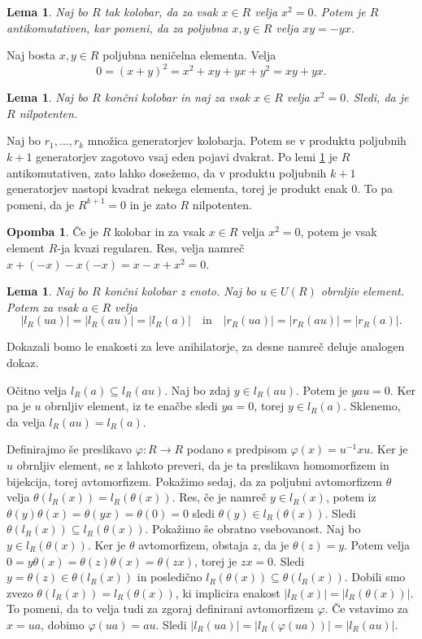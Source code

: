 \documentclass[a4paper, 12pt]{amsart}
\theoremstyle{definition} %
\newtheorem{opomba}[definicija]{Opomba}
\theoremstyle{plain} %
\newtheorem{lema}[definicija]{Lema}
\begin{document}
\begin{lema}
\label{antikomutativnost}
Naj bo $R$ tak kolobar, da za vsak $x\in R$ velja $x^2 =0 $. Potem je $R$ antikomutativen, kar pomeni, da za poljubna $x,y\in R$ velja $xy = -yx$.
\end{lema}

\proof
Naj bosta $x,y\in R$ poljubna neničelna elementa. Velja 
$$
0 = (x+y)^2 = x^2 + xy + yx + y^2 = xy + yx.
$$ 
\endproof

\begin{lema}
\label{nilpotenten}
Naj bo $R$ končni kolobar in naj za vsak $x\in R$ velja $x^2 = 0$. Sledi, da je $R$ nilpotenten.
\end{lema}

\proof
Naj bo $r_1, \dots, r_k$ množica generatorjev kolobarja. Potem se v produktu poljubnih $k+1$ generatorjev zagotovo vsaj eden pojavi dvakrat. Po lemi \ref{antikomutativnost} je $R$ antikomutativen, zato lahko dosežemo, da v produktu poljubnih $k+1$ generatorjev nastopi kvadrat nekega elementa, torej je produkt enak 0. To pa pomeni, da je $R^{k+1} = 0$ in je zato $R$ nilpotenten.  
\endproof

\begin{opomba}
Če je $R$ kolobar in za vsak $x\in R$ velja $x^2 = 0$, potem je vsak element $R$-ja kvazi regularen. Res, velja namreč $x+ (-x)  - x(-x) = x-x+x^2 = 0$.
\end{opomba}

\begin{lema}
\label{anihilatorProduktZObrnljivim}
Naj bo $R$ končni kolobar z enoto. Naj bo $u\in U(R)$ obrnljiv element. Potem za vsak $a\in R$ velja 
$$
|l_R(ua)| = |l_R(au)| = |l_R(a)| \quad \text{in}\quad |r_R(ua)| = |r_R(au)| = |r_R(a)|.
$$
\end{lema}

\proof
Dokazali bomo le enakosti za leve anihilatorje, za desne namreč deluje analogen dokaz. 

Očitno velja $l_R(a) \subseteq l_R(au)$. Naj bo zdaj $y\in l_R(au)$. Potem je $yau=0$. Ker pa je $u$ obrnljiv element, iz te enačbe sledi $ya = 0$, torej $y\in l_R(a)$. Sklenemo, da velja $l_R(au) = l_R(a)$.

Definirajmo še preslikavo $\varphi : R \rightarrow R$ podano s predpisom $\varphi(x) = u^{-1}xu$. Ker je $u$ obrnljiv element, se z lahkoto preveri, da je ta preslikava homomorfizem in bijekcija, torej avtomorfizem. Pokažimo sedaj, da za poljubni avtomorfizem $\theta$ velja $\theta(l_R(x)) = l_R(\theta(x))$. Res, če je namreč $y\in l_R(x)$, potem iz $\theta(y) \theta(x) = \theta(yx) = \theta(0) = 0$ sledi $\theta(y) \in l_R(\theta(x))$. Sledi $\theta(l_R(x)) \subseteq l_R(\theta(x))$. Pokažimo še obratno vsebovanost. Naj bo $y\in l_R(\theta(x))$. Ker je $\theta$ avtomorfizem, obstaja $z$, da je $\theta(z) = y$. Potem velja $0 = y\theta(x) = \theta(z) \theta(x)= \theta(zx)$, torej je $zx=0$. Sledi $y=\theta(z) \in \theta(l_R(x))$ in posledično $l_R(\theta(x)) \subseteq \theta(l_R(x))$. Dobili smo zvezo $\theta(l_R(x)) = l_R(\theta(x))$, ki implicira enakost $|l_R(x)| = |l_R(\theta(x))|$. To pomeni, da to velja tudi za zgoraj definirani avtomorfizem $\varphi$. Če vstavimo za $x= ua$, dobimo $\varphi(ua) = au$. Sledi $|l_R(ua)| =|l_R(\varphi(ua))| = |l_R(au)|$.
\endproof
\end{document}
